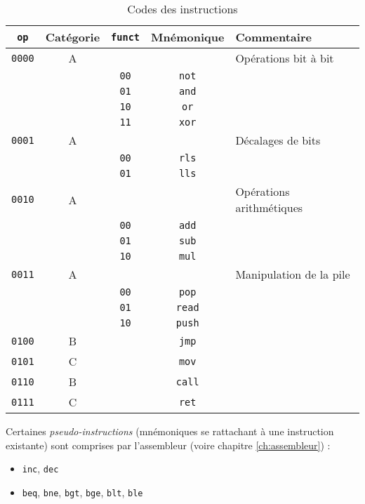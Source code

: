 \begin{table}[ht]
    \centering
    \begin{tabular}{ccccl}
    \toprule
    \texttt{op} & Catégorie & \texttt{funct} & Mnémonique & Commentaire \\
    \midrule
    \texttt{0000} & A & & & Opérations bit à bit \\
    & & \texttt{00} & \texttt{not} & \\
    & & \texttt{01} & \texttt{and} & \\
    & & \texttt{10} & \texttt{or} & \\
    & & \texttt{11} & \texttt{xor} & \\
    \texttt{0001} & A & & & Décalages de bits \\
    & & \texttt{00} & \texttt{rls} & \\
    & & \texttt{01} & \texttt{lls} & \\
    \texttt{0010} & A & & & Opérations arithmétiques \\
    & & \texttt{00} & \texttt{add} & \\
    & & \texttt{01} & \texttt{sub} & \\
    & & \texttt{10} & \texttt{mul} & \\
    \texttt{0011} & A & & & Manipulation de la pile \\
    & & \texttt{00} & \texttt{pop} & \\
    & & \texttt{01} & \texttt{read} & \\
    & & \texttt{10} & \texttt{push} & \\
    \texttt{0100} & B & & \texttt{jmp} & \\
    \texttt{0101} & C & & \texttt{mov} & \\
    \texttt{0110} & B & & \texttt{call} & \\
    \texttt{0111} & C & & \texttt{ret} & \\
    \bottomrule
    \end{tabular}
    \caption{Codes des instructions}
    \label{tab:opcodes}
\end{table}

Certaines \textit{pseudo-instructions} (mnémoniques se rattachant à une
instruction existante) sont comprises par l'assembleur (voire chapitre
\ref{ch:assembleur}) :
\begin{itemize}
\item \texttt{inc}, \texttt{dec}
\item \texttt{beq}, \texttt{bne}, \texttt{bgt}, \texttt{bge}, \texttt{blt}, \texttt{ble}
\end{itemize}

